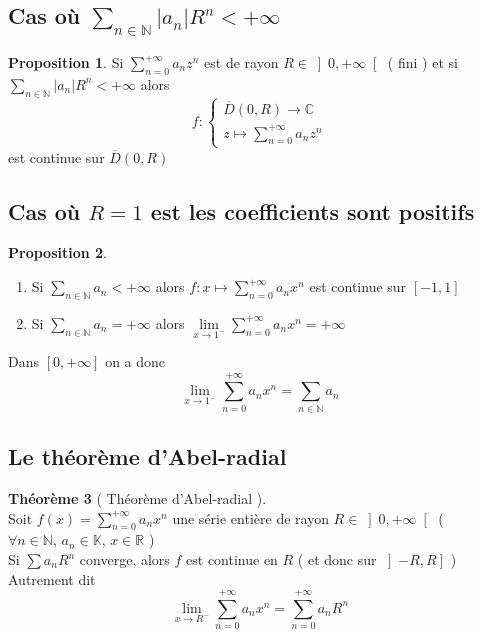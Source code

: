 \documentclass[10pt,a4paper]{article}
\theoremstyle{definition}
\newtheorem{proposition}{Proposition}[section]
\newtheorem{theorem}[proposition]{Théorème}
\begin{document}
\subsection{Cas où \(\sum\limits_{n \in \mathbb{N}} |a_n| R^n < +\infty\)}
\begin{proposition}
    Si \(\sum\limits_{n = 0}^{+\infty} a_n z^n\) est de rayon \(R \in \left] 0, +\infty \right[\) ( fini ) et si \(\sum\limits_{n \in \mathbb{N}} |a_n| R^n < +\infty\) alors
    \[f: \begin{cases} \overline{D}(0, R) \to \mathbb{C} \\
    z \mapsto \sum\limits_{n = 0}^{+\infty} a_n z^n \end{cases}\]
    est continue sur \(\overline{D}(0, R)\)
\end{proposition}

\subsection{Cas où \(R = 1\) est les coefficients sont positifs}
\begin{proposition} \hfill
    \begin{enumerate}
        \item Si \(\sum\limits_{n \in \mathbb{N}} a_n < +\infty\) alors \(f: x \mapsto \sum\limits_{n = 0}^{+\infty} a_n x^n\) est continue sur \([-1, 1]\)
        \item Si \(\sum\limits_{n \in \mathbb{N}} a_n = +\infty\) alors \(\lim\limits_{x \to 1^{-}} \sum\limits_{n = 0}^{+\infty} a_n x^n = +\infty\)
    \end{enumerate}
    Dans \([0, +\infty]\) on a donc
    \[\lim_{x \to 1^{-}} \sum_{n = 0}^{+\infty} a_n x^n = \sum_{n \in \mathbb{N}} a_n\]
\end{proposition}

\subsection{Le théorème d'Abel-radial}
\begin{theorem}[ Théorème d'Abel-radial ]
    \hfill \\
    Soit \(f(x) = \sum\limits_{n = 0}^{+\infty} a_n x^n\) une série entière de rayon \(R \in \left] 0, +\infty \right[\) ( \(\forall n \in \mathbb{N},\, a_n \in \mathbb{K},\, x \in \mathbb{R}\) ) \\
    Si \(\sum a_n R^n\) converge, alors \(f\) est continue en \(R\) ( et donc sur \(\left] -R, R \right]\) ) \\
    Autrement dit
    \[\lim_{x \to R^{-}} \sum_{n = 0}^{+\infty} a_n x^n = \sum_{n = 0}^{+\infty} a_n R^n\]
\end{theorem}
\end{document}
